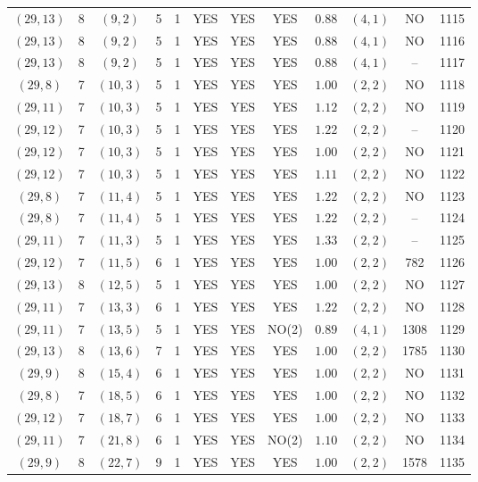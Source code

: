 \begin{longtable}{|c|c|c|c|c|c|c|c|c|c|c|c|}
$(29,13)$ & 8 & $(9,2)$ & 5 & 1 & YES & YES & YES & $0.88$ & $(4,1)$ & NO & 1115\\
$(29,13)$ & 8 & $(9,2)$ & 5 & 1 & YES & YES & YES & $0.88$ & $(4,1)$ & NO & 1116\\
$(29,13)$ & 8 & $(9,2)$ & 5 & 1 & YES & YES & YES & $0.88$ & $(4,1)$ & -- & 1117\\
$(29,8)$ & 7 & $(10,3)$ & 5 & 1 & YES & YES & YES & $1.00$ & $(2,2)$ & NO & 1118\\
$(29,11)$ & 7 & $(10,3)$ & 5 & 1 & YES & YES & YES & $1.12$ & $(2,2)$ & NO & 1119\\
$(29,12)$ & 7 & $(10,3)$ & 5 & 1 & YES & YES & YES & $1.22$ & $(2,2)$ & -- & 1120\\
$(29,12)$ & 7 & $(10,3)$ & 5 & 1 & YES & YES & YES & $1.00$ & $(2,2)$ & NO & 1121\\
$(29,12)$ & 7 & $(10,3)$ & 5 & 1 & YES & YES & YES & $1.11$ & $(2,2)$ & NO & 1122\\
$(29,8)$ & 7 & $(11,4)$ & 5 & 1 & YES & YES & YES & $1.22$ & $(2,2)$ & NO & 1123\\
$(29,8)$ & 7 & $(11,4)$ & 5 & 1 & YES & YES & YES & $1.22$ & $(2,2)$ & -- & 1124\\
$(29,11)$ & 7 & $(11,3)$ & 5 & 1 & YES & YES & YES & $1.33$ & $(2,2)$ & -- & 1125\\
$(29,12)$ & 7 & $(11,5)$ & 6 & 1 & YES & YES & YES & $1.00$ & $(2,2)$ & 782 & 1126\\
$(29,13)$ & 8 & $(12,5)$ & 5 & 1 & YES & YES & YES & $1.00$ & $(2,2)$ & NO & 1127\\
$(29,11)$ & 7 & $(13,3)$ & 6 & 1 & YES & YES & YES & $1.22$ & $(2,2)$ & NO & 1128\\
$(29,11)$ & 7 & $(13,5)$ & 5 & 1 & YES & YES & NO(2) & $0.89$ & $(4,1)$ & 1308 & 1129\\
$(29,13)$ & 8 & $(13,6)$ & 7 & 1 & YES & YES & YES & $1.00$ & $(2,2)$ & 1785 & 1130\\
$(29,9)$ & 8 & $(15,4)$ & 6 & 1 & YES & YES & YES & $1.00$ & $(2,2)$ & NO & 1131\\
$(29,8)$ & 7 & $(18,5)$ & 6 & 1 & YES & YES & YES & $1.00$ & $(2,2)$ & NO & 1132\\
$(29,12)$ & 7 & $(18,7)$ & 6 & 1 & YES & YES & YES & $1.00$ & $(2,2)$ & NO & 1133\\
$(29,11)$ & 7 & $(21,8)$ & 6 & 1 & YES & YES & NO(2) & $1.10$ & $(2,2)$ & NO & 1134\\
$(29,9)$ & 8 & $(22,7)$ & 9 & 1 & YES & YES & YES & $1.00$ & $(2,2)$ & 1578 & 1135\\

\end{longtable}
